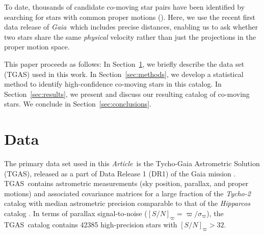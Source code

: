 \documentclass[manuscript, letterpaper]{aastex6}
\newcommand{\project}[1]{\textsl{#1}}
\newcommand{\acronym}[1]{{\small{#1}}}
\newcommand{\gaia}{\project{Gaia}}
\newcommand{\documentname}{\textsl{Article}}
\newcommand{\sectionname}{Section}
\newcommand{\dr}{\acronym{DR1}}
\newcommand{\tgas}{\acronym{TGAS}}
\newcommand{\snr}{[S/N]_\varpi}
\begin{document}
To date, thousands of candidate co-moving star pairs have been identified by
searching for stars with common proper motions
(\citealt{Poveda:1994aa,Allen:2000aa,Chaname:2004aa,Lepine:2007aa,Alonso-Floriano:2015aa}).
Here, we use the recent first data release of \gaia\ which includes precise distances,
enabling us to ask whether two stars share the same {\it physical} velocity rather than
just the projections in the proper motion space.

This paper proceeds as follows:
In \sectionname~\ref{sec:data}, we briefly describe the data set (TGAS) used in
this work.
In \sectionname~\ref{sec:methods}, we develop a statistical method to identify
high-confidence co-moving stars in this catalog.
In \sectionname~\ref{sec:results}, we present and discuss our resulting catalog
of co-moving stars.
We conclude in \sectionname~\ref{sec:conclusions}.



\section{Data} \label{sec:data}

The primary data set used in this \documentname\ is the Tycho-Gaia Astrometric
Solution (\tgas), released as a part of Data Release 1 (\dr) of the Gaia mission
\citep{Gaia-Collaboration:2016aa,Lindegren:2016aa}.
\tgas\ contains astrometric measurements (sky position,
parallax, and proper motions) and associated covariance matrices for a large
fraction of the \project{Tycho-2} catalog \citep{2000A&A...355L..27H} with median
astrometric precision comparable to that of the \project{Hipparcos} catalog
\citep[$\approx 0.3~{\rm mas}$;][]{2007ASSL..350.....V}. In terms of parallax
signal-to-noise ($\snr = \varpi/\sigma_\varpi$), the \tgas\ catalog contains
42385 high-precision stars with $\snr > 32$.
\end{document}
